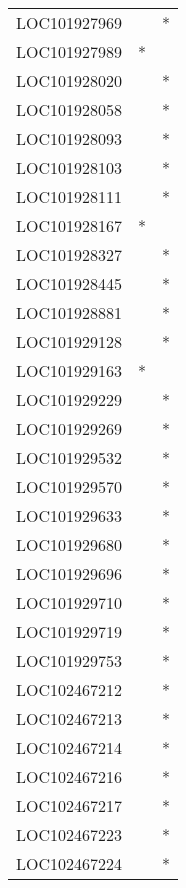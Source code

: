 \begin{longtable}{lcc}
LOC101927969    &                &          * \\
LOC101927989    &              * &            \\
LOC101928020    &                &          * \\
LOC101928058    &                &          * \\
LOC101928093    &                &          * \\
LOC101928103    &                &          * \\
LOC101928111    &                &          * \\
LOC101928167    &              * &            \\
LOC101928327    &                &          * \\
LOC101928445    &                &          * \\
LOC101928881    &                &          * \\
LOC101929128    &                &          * \\
LOC101929163    &              * &            \\
LOC101929229    &                &          * \\
LOC101929269    &                &          * \\
LOC101929532    &                &          * \\
LOC101929570    &                &          * \\
LOC101929633    &                &          * \\
LOC101929680    &                &          * \\
LOC101929696    &                &          * \\
LOC101929710    &                &          * \\
LOC101929719    &                &          * \\
LOC101929753    &                &          * \\
LOC102467212    &                &          * \\
LOC102467213    &                &          * \\
LOC102467214    &                &          * \\
LOC102467216    &                &          * \\
LOC102467217    &                &          * \\
LOC102467223    &                &          * \\
LOC102467224    &                &          * \\

\end{longtable}
